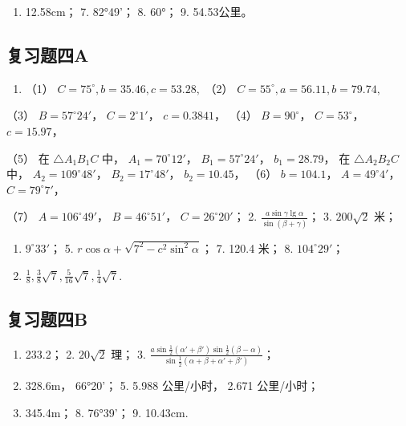 \begin{enumerate}[start=5]
\item
  12.58cm； 7. 82°49'； 8. 60°； 9. 54.53公里。
\end{enumerate}

\subsection{复习题四A}

\begin{enumerate}
\item
  （1） \(C = 75^{\circ}, b = 35.46, c = 53.28,\) （2）
  \(C = 55^{\circ}, a = 56.11, b = 79.74,\)
\end{enumerate}

（3） \(B = 57^{\circ}24'\)， \(C = 2^{\circ}1'\)， \(c = 0.3841\)，
（4） \(B = 90^{\circ}\)， \(C = 53^{\circ}\)， \(c = 15.97\)，

（5） 在 \(\triangle A_{1}B_{1}C\) 中， \(A_{1} = 70^{\circ}12'\)，
\(B_{1} = 57^{\circ}24'\)， \(b_{1} = 28.79\)， 在
\(\triangle A_{2}B_{2}C\) 中， \(A_{2} = 109^{\circ}48'\)，
\(B_{2} = 17^{\circ}48'\)， \(b_{2} = 10.45\)， （6） \(b = 104.1\)，
\(A = 49^{\circ}4'\)， \(C = 79^{\circ}7'\)，

（7） \(A = 106^{\circ}49'\)， \(B = 46^{\circ}51'\)，
\(C = 26^{\circ}20'\)； 2.
\(\frac{a\sin\gamma\lg\alpha}{\sin(\beta+\gamma)}\)； 3. \(200\sqrt{2}\)
米；

\begin{enumerate}[start=4]
\item
  \(9^{\circ}33'\)； 5.
  \(r\cos\alpha+\sqrt{7^{2}-c^{2}\sin^{2}\alpha}\)； 7. 120.4 米； 8.
  \(104^{\circ}29'\)；
\item
  \(\frac{1}{8}, \frac{3}{8}\sqrt{7}, \frac{5}{16}\sqrt{7}, \frac{1}{4}\sqrt{7}\).
\end{enumerate}

\subsection{复习题四B}

\begin{enumerate}
\item
  233.2； 2. \(20\sqrt{2}\) 理； 3.
  \(\frac{a\sin\frac{1}{2}(\alpha' + \beta')\sin\frac{1}{2}(\beta - \alpha)}{\sin\frac{1}{2}(\alpha + \beta + \alpha' + \beta')}\)；
\item
  328.6m， 66°20'； 5. 5.988 公里/小时， 2.671 公里/小时；
\item
  345.4m； 8. 76°39'； 9. 10.43cm.
\end{enumerate}

